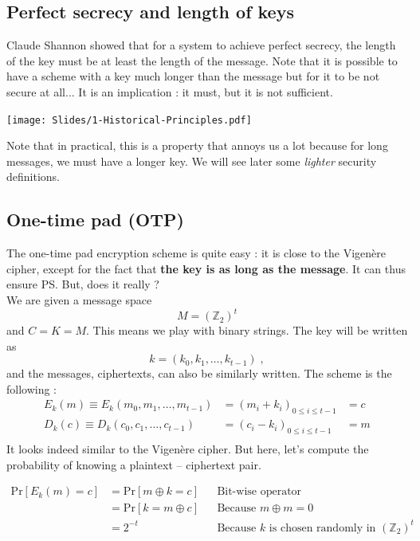 \documentclass[a4paper, 12pt]{book}
\begin{document}
\subsection{Perfect secrecy and length of keys}
Claude Shannon showed that for a system to achieve perfect secrecy, the length of the key must be at least the length of the message. Note that it is possible to have a scheme with a key much longer than the message but for it to be not secure at all... It is an implication : it must, but it is not sufficient.  \\
\begin{center}
    \texttt{[image: Slides/1-Historical-Principles.pdf]}
\end{center}
Note that in practical, this is a property that annoys us a lot because for long messages, we must have a longer key. We will see later some \textit{lighter} security definitions.

\subsection{One-time pad (OTP)}
The one-time pad encryption scheme is quite easy : it is close to the Vigenère cipher, except for the fact that \textbf{the key is as long as the message}. It can thus ensure PS. But, does it really ? \\

We are given a message space $$ M = (\mathbb{Z}_2)^t$$ and $C = K = M$. This means we play with binary strings. The key will be written as $$ k = (k_0,k_1, \dots, k_{t-1}) \; ,$$
and the messages, ciphertexts, can also be similarly written. The scheme is the following :
$$
\begin{array}{lll}
    E_k(m) \equiv E_k(m_0, m_1, \dots, m_{t-1}) &= (m_i + k_i)_{0\leq i \leq t-1} &= c \\
    D_k(c) \equiv D_k(c_0, c_1, \dots, c_{t-1}) &= (c_i - k_i)_{0\leq i \leq t-1} &= m \\
\end{array}$$
It looks indeed similar to the Vigenère cipher. But here, let's compute the probability of knowing a plaintext -- ciphertext pair.


\begin{align*}
\mathrm{Pr}[E_k(m) = c] &= \mathrm{Pr}[m\oplus k = c] && \text{Bit-wise operator}\\
&= \mathrm{Pr}[k = m \oplus c] && \text{Because $m\oplus m = 0$}\\
&= 2^{-t} && \text{Because $k$ is chosen randomly in $(\mathbb{Z}_2)^t$}
\end{align*}
\end{document}
